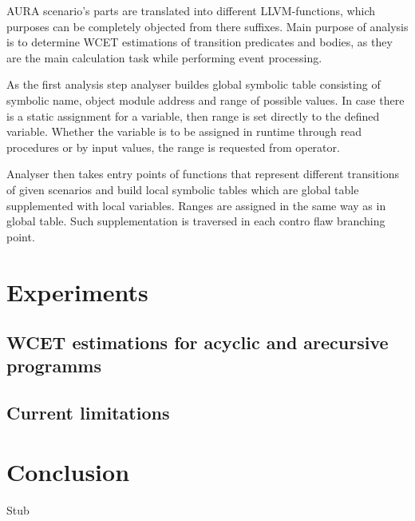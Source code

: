 \documentclass[10pt, conference, compsocconf]{IEEEtran}
\begin{document}
AURA scenario's parts are translated into different LLVM-functions, which purposes can be completely objected from there suffixes. Main purpose of analysis is to determine WCET estimations of transition predicates and bodies, as they are the main calculation task while performing event processing.

As the first analysis step analyser buildes global symbolic table consisting of symbolic name, object module address and range of possible values. In case there is a static assignment for a variable, then range is set directly to the defined variable. Whether the variable is to be assigned in runtime through read procedures or by input values, the range is requested from operator.
  
Analyser then takes entry points of functions that represent different transitions of given scenarios and build local symbolic tables which are global table supplemented with local variables. Ranges are assigned in the same way as in global table. Such supplementation is traversed in each contro flaw branching point.



\section{Experiments}

\subsection{WCET estimations for acyclic and arecursive programms}




\subsection{Current limitations}



\section{Conclusion}



\begin{thebibliography}{99}
Stub
\end{thebibliography}
\end{document}
